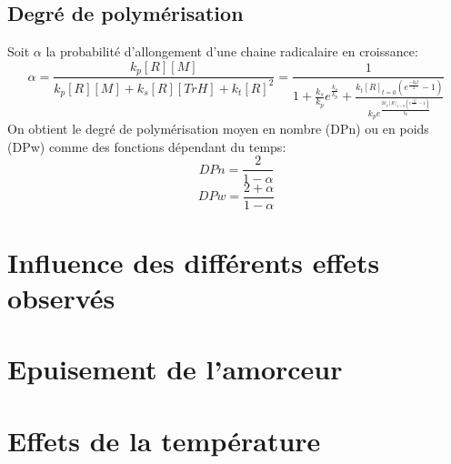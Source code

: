 \documentclass[a4paper,oneside,12pt]{article}
\begin{document}
\subsection{Degré de polymérisation}
Soit $\alpha$ la probabilité d'allongement d'une chaine radicalaire en croissance: 
$$\alpha=\frac{k_p[R][M]}{k_p[R][M]+k_s[R][TrH]+k_t[R]^2}
=\frac{1}
      {1+   \frac{k_s}{k_p}e^{\frac{k_s}{k_p}}     +\frac{k_t[R]_{t=0}(e^{\frac{-k_0t}{2}}-1)}        
                                                    {k_pe^{\frac{2k_p[R]_{t=0}(e^{\frac{-k_0t}{2}}-1)}{k_0}    }}
                                                    }$$
On obtient le degré de polymérisation moyen en nombre (DPn) ou en poids (DPw) comme des fonctions dépendant du temps:
$$DPn=\frac{2}{1-\alpha}$$
$$DPw=\frac{2+\alpha}{1-\alpha}$$

\section{Influence des différents effets observés}

\section{Epuisement de l'amorceur}

\section{Effets de la température}
\end{document}
